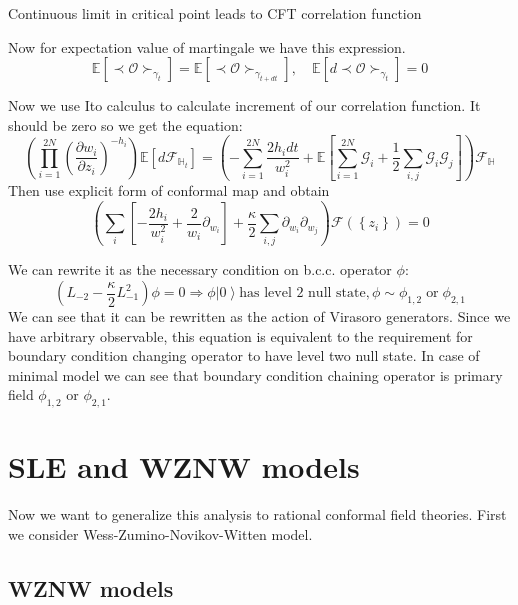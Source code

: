 \documentclass[12pt]{article}
\theoremstyle{definition}
\theoremstyle{definition} \newtheorem{Def}{Definition}
\begin{document}
Continuous limit in critical point leads to CFT correlation function

Now for expectation value of martingale we have this expression.
\begin{equation*}
  \mathbb{E}\left[\prec\mathcal{O}\succ_{\gamma_{t}}\right]=    \mathbb{E}\left[\prec\mathcal{O}\succ_{\gamma_{t+dt}}\right], \quad \mathbb{E}\left[d \prec\mathcal{O}\succ_{\gamma_{t}}\right]=0
\end{equation*}

Now we use Ito calculus to calculate increment of our correlation function. It should be zero so we get the equation:
\begin{equation*}
  \left(\prod_{i=1}^{2N}\left(\frac{\partial w_{i}}{\partial z_{i}}\right)^{-h_{i}}\right)\mathbb{E}\left[d 
    \mathcal{F}_{\mathbb{H}_{t}}\right]=\left(-\sum_{i=1}^{2N}\frac{2h_{i}dt}{w_{i}^{2}}+\mathbb{E}\left[\sum_{i=1}^{2N}\mathcal{G}_{i}+\frac{1}{2}
      \sum_{i,j}\mathcal{G}_{i}\mathcal{G}_{j}\right]\right)\mathcal{F}_{\mathbb{H}}
\end{equation*}
Then use explicit form of conformal map and obtain
\begin{equation*}
  \left( \sum_{i}\left[-\frac{2h_{i}}{w_{i}^{2}} +\frac{2}{w_{i}}\partial_{w_{i}}\right]+\frac{\kappa}{2}\sum_{i,j}\partial_{w_{i}} \partial_{w_{j}}\right)\mathcal{F}(\left\{z_{i}\right\})=0
\end{equation*}

We can rewrite it as the necessary condition on b.c.c. operator $\phi$:
\begin{equation*}
  (L_{-2}-\frac{\kappa}{2}L_{-1}^{2})\phi=0 \Longrightarrow \phi \left|0\right>  \text{has level 2 null state}, \phi\sim \phi_{1,2} \;\text{or}\; \phi_{2,1}
\end{equation*}
We can see that it can be rewritten as the action of Virasoro generators. Since we have arbitrary observable, this equation is equivalent to the requirement for boundary condition changing operator to have level two null state. 
In case of minimal model we can see that boundary condition chaining operator is primary field $\phi_{1,2}$ or $\phi_{2,1}$.

\section{SLE and WZNW models}
\label{sec:sle-wzw-models}
Now we want to generalize this analysis to rational conformal field theories. First we consider Wess-Zumino-Novikov-Witten model.
\subsection{WZNW models}
\end{document}
